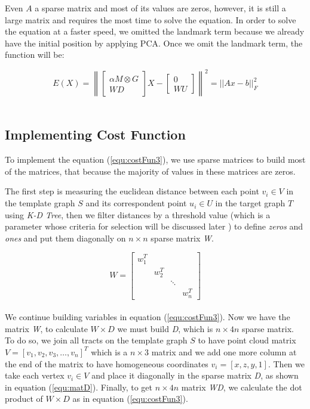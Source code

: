\documentclass[../structure.tex]{subfiles}
\begin{document}
Even $A$ a sparse matrix and most of its values are zeros, however, it is still a large matrix and requires the most time to solve the equation. In order to solve the equation at a faster speed, we omitted the landmark term because we already have the initial position by applying PCA. Once we omit the landmark term, the function will be:

\begin{equation}
E(X) = \left\|
\begin{bmatrix}
\alpha M \otimes G \\ WD
\end{bmatrix}
X -
\begin{bmatrix}
0 \\ WU
\end{bmatrix}
\right\| ^2
= ||Ax - b||_{F}^2
\label{equ:costFun3}
\end{equation}\\

\subsection{Implementing Cost Function}
\hspace{2em}To implement the equation (\ref{equ:costFun3}), we use sparse matrices to build most of the matrices, that because the majority of values in these matrices are zeros.

The first step is measuring the euclidean distance between each point $v_{i}\in V$ in the template graph $S$ and its correspondent point $u_{i}\in U$ in the target graph $T$ using \textit{K-D Tree}, then we filter distances by a threshold value (which is a parameter whose criteria for selection will be discussed later ) to define \textit{zeros} and \textit{ones} and put them diagonally on $n\times n$ sparse matrix \textit{W}.

\begin{equation*}
W =
\begin{bmatrix}
w_{1}^T & & & \\
& w_{2}^T & & \\
& & \ddots & \\
& & & w_{n}^T
\end{bmatrix}
\end{equation*}\\

We continue building variables in equation (\ref{equ:costFun3}). Now we have the matrix \textit{W}, to calculate $W\times D$ we must build \textit{D}, which is $n\times 4n$ sparse matrix. To do so, we join all tracts on the template graph $S$ to have point cloud matrix $V=[v_{1}, v_{2}, v_{3}, \dots , v_{n}]^T$ which is a $n\times 3$ matrix and we add one more column at the end of the matrix to have homogeneous coordinates $v_{i}=[x,z,y,1]$. Then we take each vertex $v_{i} \in V$ and place it diagonally in the sparse matrix \textit{D}, as shown in equation (\ref{equ:matD}). Finally, to get $n\times 4n$ matrix \textit{WD}, we calculate the dot product of $W\times D$ as in equation (\ref{equ:costFun3}).
\end{document}
